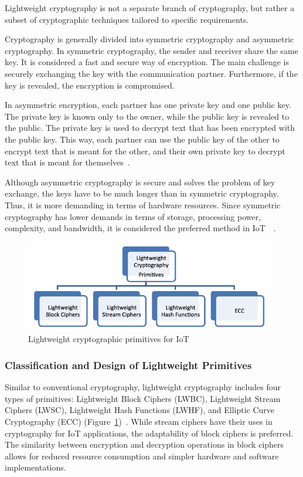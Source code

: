 Lightweight cryptography is not a separate branch of cryptography, but rather a subset of cryptographic techniques tailored to specific requirements.

Cryptography is generally divided into symmetric cryptography and asymmetric cryptography. In symmetric cryptography, the sender and receiver share the same key. It is considered a fast and secure way of encryption. The main challenge is securely exchanging the key with the communication partner. Furthermore, if the key is revealed, the encryption is compromised. 

In asymmetric encryption, each partner has one private key and one public key. The private key is known only to the owner, while the public key is revealed to the public. The private key is used to decrypt text that has been encrypted with the public key. This way, each partner can use the public key of the other to encrypt text that is meant for the other, and their own private key to decrypt text that is meant for themselves~\cite{ekwueme2024lightweight}. 

Although asymmetric cryptography is secure and solves the problem of key exchange, the keys have to be much longer than in symmetric cryptography. Thus, it is more demanding in terms of hardware resources. Since symmetric cryptography has lower demands in terms of storage, processing power, complexity, and bandwidth, it is considered the preferred method in IoT~\cite{khudoykulov2022comparison}~\cite{ekwueme2024lightweight}.

\begin{figure}[h]
    \centering
    \includegraphics[width=11cm, height=4cm]{media/primitives_for_IoT.png}
    \caption{Lightweight cryptographic primitives for IoT}
    \label{fig:primitives_for_IoT}
\end{figure}


\subsubsection{Classification and Design of Lightweight Primitives}
Similar to conventional cryptography, lightweight cryptography includes four types of primitives: Lightweight Block Ciphers (LWBC), Lightweight Stream Ciphers (LWSC), Lightweight Hash Functions (LWHF), and Elliptic Curve Cryptography (ECC) (Figure~\ref{fig:primitives_for_IoT})~\cite{dhanda2020lightweight}. While stream ciphers have their uses in cryptography for IoT applications, the adaptability of block ciphers is preferred. The similarity between encryption and decryption operations in block ciphers allows for reduced resource consumption and simpler hardware and software implementations.

